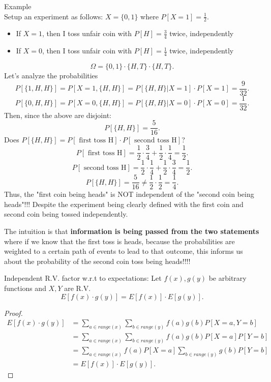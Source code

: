 \documentclass[a4paper]{article}
\begin{document}
\begin{note}{Example}\\
  Setup an experiment as follows: $X = \{0,1\}$ where $P[X=1]=\frac{1}{2}$.
  \begin{itemize}
    \item If $X=1$, then I toss unfair coin with  $P[H] = \frac{3}{4}$ twice, independently
    \item If $X=0$, then I toss unfair coin with  $P[H] = \frac{1}{4}$ twice, independently
  \end{itemize}
  \[
    \Omega = \{0,1\} \cdot \{H,T\} \cdot \{H,T\}   
  .\] 
  Let's analyze the probabilities
  \[
    P[\{1,H,H\}] = P[X=1, \{H,H\}] = P[\{H,H\} | X=1] \cdot P[X=1] = \frac{9}{32}   
  .\] 
  \[
    P[\{0,H,H\}] =P[X=0, \{H,H\}] = P[\{H,H\} | X=0] \cdot P[X=0] = \frac{1}{32}   
  .\] 
  Then, since the above are disjoint:
  \[
    P[\{H,H\}] = \frac{5}{16} 
  .\] 
  Does $P[\{H,H\}] = P[\text{ first toss H}] \cdot P[\text{ second toss H}]$?
  \[
    P[\text{ first toss H}] = \frac{1}{2} \cdot \frac{3}{4} + \frac{1}{2} \cdot \frac{1}{4} = \frac{1}{2}
  .\] 
  \[
    P[\text{ second toss H}] = \frac{1}{2} \cdot \frac{1}{4} + \frac{1}{2} \cdot \frac{3}{4} = \frac{1}{2}
  .\] 
  \[
    P[\{H,H\}] = \frac{5}{16} \neq \frac{1}{2} \cdot \frac{1}{2} = \frac{1}{4} 
  .\] 
Thus, the "first coin being heads" is NOT independent of the "second coin being heads"!!! Despite
the experiment being clearly defined with the first coin and second coin being tossed independently.

The intuition is that \textbf{information is being passed from the two statements} where if we 
know that the first toss is heads, because the probabilities are weighted to a certain path of 
events to lead to that outcome, this informs us about the probability of the second coin toss 
being heads!!!!
\end{note}

\begin{prop}
  Independent R.V. factor w.r.t to expectations: Let $f(x), g(y)$ be arbitrary functions and  $X,Y$ are R.V.
   \[
     E[f(x) \cdot g(y)] = E[f(x)] \cdot E[g\left( y \right)] 
  .\] 

  \begin{proof}
    \begin{align*}
      E[f(x) \cdot g(y)] &= \sum_{a \in range(x)} \sum_{b \in range(y)} f(a) g(b) P[X=a,Y=b] \\
                         &=  \sum_{a \in range(x)} \sum_{b \in range(y)} f(a) g(b) P[X=a] P[Y=b]\\
                         &=  \sum_{a \in range(x)} f(a) P[X=a] \sum_{b \in range(y)} g(b) P[Y=b]\\ 
                         &= E[f(x)] \cdot E[g(y)]
    .\end{align*}
  \end{proof}
\end{prop}
\end{document}

